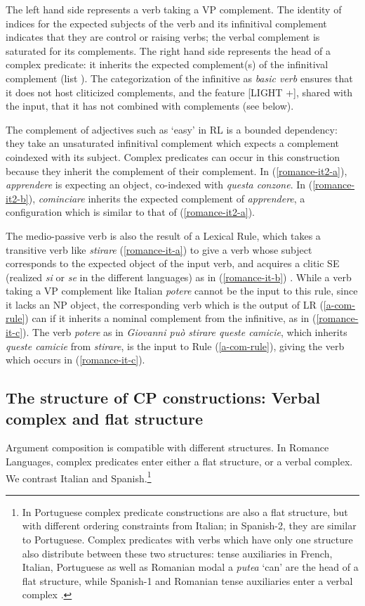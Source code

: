 \documentclass[output=paper]{langsci/langscibook}
\begin{document}
The left hand side represents a verb taking a VP complement. The identity of indices for the expected subjects of the verb and its infinitival complement indicates that they are control or raising verbs; the verbal complement is saturated for its complements. The right hand side represents the head of a complex predicate: it inherits the expected complement(s) of the infinitival complement (list ). The categorization of the infinitive as \textit{basic verb} ensures that it does not host cliticized complements, and the feature [LIGHT +], shared with the input, that it has not combined with complements (see below).  

The complement of adjectives such as ‘easy’ in RL is a bounded dependency: they take an unsaturated infinitival complement which expects a complement coindexed with its subject. Complex predicates can occur in this construction because they inherit the complement of their complement. In (\ref{romance-it2-a}), \textit{apprendere} is expecting an object, co-indexed with \textit{questa conzone}. In (\ref{romance-it2-b}), \textit{cominciare} inherits the expected complement of \textit{apprendere}, a configuration which is similar to that of (\ref{romance-it2-a}). 


The medio-passive verb is also the result of a Lexical Rule, which takes a transitive verb like \textit{stirare} (\ref{romance-it-a}) to give a verb whose subject corresponds to the expected object of the input verb, and acquires a clitic SE (realized \textit{si} or \textit{se} in the different languages) as in (\ref{romance-it-b}) \citep{Monachesi98a}. While a verb taking a VP complement like Italian \textit{potere} cannot be the input to this rule, since it lacks an NP object, the corresponding verb which is the output of LR (\ref{a-com-rule}) can if it inherits a nominal complement from the infinitive, as in (\ref{romance-it-c}). The verb \textit{potere} as in \textit{Giovanni pu\`o stirare queste camicie}, which inherits \textit{queste camicie} from \textit{stirare}, is the input to Rule  (\ref{a-com-rule}), giving the verb which occurs in (\ref{romance-it-c}). 

\subsection{The structure of CP constructions: Verbal complex and flat structure}
\label{sec-structure-CP}

Argument composition is compatible with different structures. In Romance Languages, complex predicates enter either a flat structure, or a verbal complex. We contrast Italian and Spanish.\footnote{In Portuguese complex predicate constructions are also a flat structure, but with different ordering constraints from Italian; in Spanish-2, they are similar to Portuguese. Complex predicates with verbs which have only one structure also distribute between these two structures: tense auxiliaries in French, Italian, Portuguese as well as Romanian modal a \textit{putea} `can' are the head of a flat structure, while Spanish-1 and Romanian tense auxiliaries enter a verbal complex \citep{AG2010}.}
\end{document}
